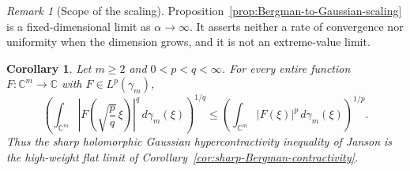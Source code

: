 \documentclass[11pt,reqno]{amsart}
\numberwithin{equation}{section}
\newtheorem{corollary}[theorem]{Corollary}
\theoremstyle{definition}
\theoremstyle{remark}
\newtheorem{remark}[theorem]{Remark}
\begin{document}
\begin{remark}[Scope of the scaling]
Proposition~\ref{prop:Bergman-to-Gaussian-scaling} is a fixed-dimensional
limit as \(\alpha\to\infty\).  It asserts neither a rate of convergence nor
uniformity when the dimension grows, and it is not an extreme-value limit.
\end{remark}

\begin{corollary}
\label{cor:Gaussian-Fock-hypercontractivity}
Let \(m\ge2\) and \(0<p<q<\infty\).  For every entire function
\(F:\mathbb C^m\to\mathbb C\) with \(F\in L^p(\gamma_m)\),
\begin{equation}
 \left(
 \int_{\mathbb C^m}
 \left|F\!\left(\sqrt{\frac{p}q}\,\xi\right)\right|^q
 \,d\gamma_m(\xi)
 \right)^{1/q}
 \le
 \left(
 \int_{\mathbb C^m}|F(\xi)|^p\,d\gamma_m(\xi)
 \right)^{1/p}.
 \label{eq:Janson-hypercontractivity}
\end{equation}
Thus the sharp holomorphic Gaussian hypercontractivity inequality of
Janson \cite{Janson1983} is the high-weight flat limit of
Corollary~\ref{cor:sharp-Bergman-contractivity}.
\end{corollary}
\end{document}
